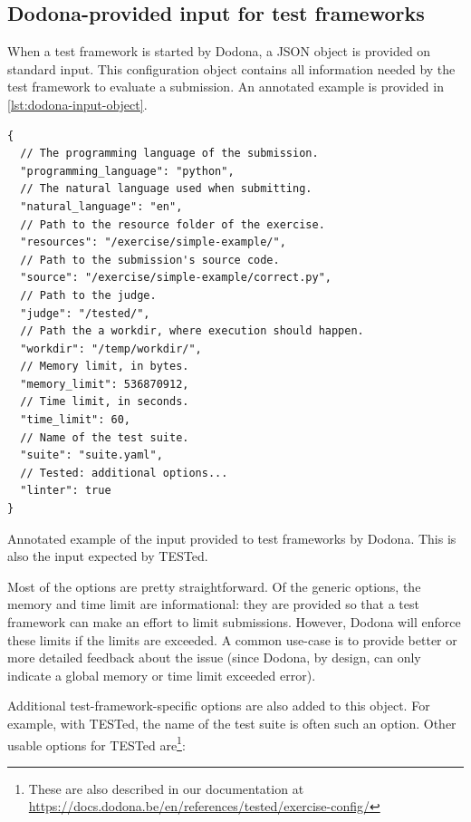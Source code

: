 \documentclass[../main]{subfiles}
\begin{document}
\subsection{Dodona-provided input for test frameworks}\label{subsec:dodona-input}

When a test framework is started by Dodona, a JSON object is provided on standard input.
This configuration object contains all information needed by the test framework to evaluate a submission.
An annotated example is provided in \vref{lst:dodona-input-object}.

\begin{listing}
    \begin{verbatim}
{
  // The programming language of the submission.
  "programming_language": "python",
  // The natural language used when submitting.
  "natural_language": "en",
  // Path to the resource folder of the exercise.
  "resources": "/exercise/simple-example/",
  // Path to the submission's source code.
  "source": "/exercise/simple-example/correct.py",
  // Path to the judge.
  "judge": "/tested/",
  // Path the a workdir, where execution should happen.
  "workdir": "/temp/workdir/",
  // Memory limit, in bytes.
  "memory_limit": 536870912,
  // Time limit, in seconds.
  "time_limit": 60,
  // Name of the test suite.
  "suite": "suite.yaml",
  // Tested: additional options...
  "linter": true
}
    \end{verbatim}
    \caption{
        Annotated example of the input provided to test frameworks by Dodona.
        This is also the input expected by TESTed.
    }
    \label{lst:dodona-input-object}
\end{listing}

Most of the options are pretty straightforward.
Of the generic options, the memory and time limit are informational: they are provided so that a test framework can make an effort to limit submissions.
However, Dodona will enforce these limits if the limits are exceeded.
A common use-case is to provide better or more detailed feedback about the issue (since Dodona, by design, can only indicate a global memory or time limit exceeded error).

Additional test-framework-specific options are also added to this object.
For example, with TESTed, the name of the test suite is often such an option.
Other usable options for TESTed are\footnote{These are also described in our documentation at \url{https://docs.dodona.be/en/references/tested/exercise-config/}}:
\end{document}
